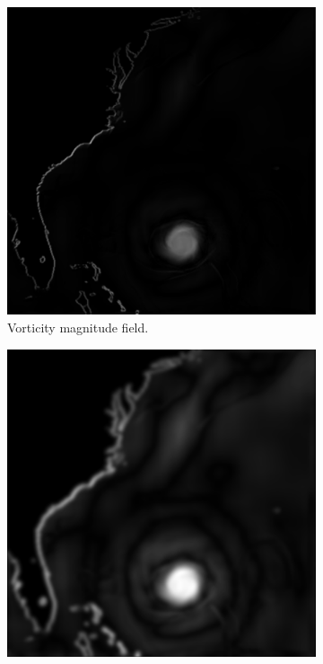 \documentclass{article}
\begin{document}
\begin{figure}[h!]
    \centering
    \begin{subfigure}{0.32\textwidth}
        \centering
        \includegraphics[width=\textwidth]{vorticity_map.png}
        \caption{Vorticity magnitude field.}
    \end{subfigure}
    \hfill
    \begin{subfigure}{0.32\textwidth}
        \centering
        \includegraphics[width=\textwidth]{pow_0_6.png}

\end{subfigure}
\end{figure}
\end{document}
